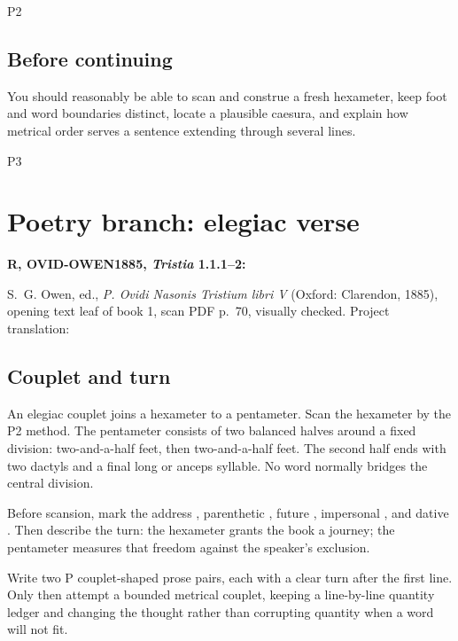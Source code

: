 \begin{courseunit}{P2}
\section{Before continuing}
You should reasonably be able to scan and construe a fresh hexameter, keep foot
and word boundaries distinct, locate a plausible caesura, and explain how
metrical order serves a sentence extending through several lines.
\fi
\end{courseunit}

\begin{courseunit}{P3}
\chapter{Poetry branch: elegiac verse}

\textbf{R, OVID-OWEN1885, \textit{Tristia} 1.1.1--2:}
\begin{quote}
\end{quote}

S.~G. Owen, ed., \textit{P. Ovidi Nasonis Tristium libri V} (Oxford:
Clarendon, 1885), opening text leaf of book 1, scan PDF p.~70, visually checked.
Project translation: 

\section{Couplet and turn}

An elegiac couplet joins a hexameter to a pentameter. Scan the hexameter by the
P2 method. The pentameter consists of two balanced halves around a fixed
division: two-and-a-half feet, then two-and-a-half feet. The second half ends
with two dactyls and a final long or anceps syllable. No word normally bridges
the central division.

Before scansion, mark the address , parenthetic
, future , impersonal , and
dative . Then describe the turn: the hexameter grants the
book a journey; the pentameter measures that freedom against the speaker's
exclusion.

Write two P couplet-shaped prose pairs, each with a clear turn after the first
line. Only then attempt a bounded metrical couplet, keeping a line-by-line
quantity ledger and changing the thought rather than corrupting quantity when
a word will not fit.


\end{courseunit}
